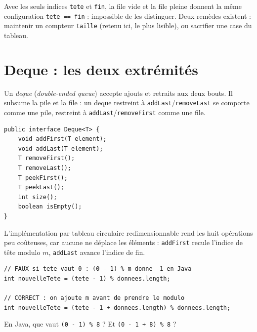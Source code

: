 \documentclass[11pt,a4paper]{article}
\theoremstyle{definition}
\theoremstyle{remark}
\begin{document}
\begin{attentionbox}
Avec les seuls indices \texttt{tete} et \texttt{fin}, la file vide et la file
pleine donnent la même configuration \texttt{tete == fin} : impossible de les
distinguer. Deux remèdes existent : maintenir un compteur \texttt{taille}
(retenu ici, le plus lisible), ou sacrifier une case du tableau.
\end{attentionbox}

\section{Deque : les deux extrémités}

Un \emph{deque} (\emph{double-ended queue}) accepte ajouts et retraits aux
deux bouts. Il subsume la pile et la file : un deque restreint à
\texttt{addLast}/\texttt{removeLast} se comporte comme une pile, restreint à
\texttt{addLast}/\texttt{removeFirst} comme une file.

\begin{lstlisting}[caption={L'ADT Deque --- le contrat que vous implémenterez en Lab}]
public interface Deque<T> {
    void addFirst(T element);
    void addLast(T element);
    T removeFirst();
    T removeLast();
    T peekFirst();
    T peekLast();
    int size();
    boolean isEmpty();
}
\end{lstlisting}

L'implémentation par tableau circulaire redimensionnable rend les huit
opérations peu coûteuses, car aucune ne déplace les éléments : \texttt{addFirst}
recule l'indice de tête modulo $m$, \texttt{addLast} avance l'indice de fin.

\begin{lstlisting}[caption={Reculer un indice sans nombre négatif}]
// FAUX si tete vaut 0 : (0 - 1) % m donne -1 en Java
int nouvelleTete = (tete - 1) % donnees.length;

// CORRECT : on ajoute m avant de prendre le modulo
int nouvelleTete = (tete - 1 + donnees.length) % donnees.length;
\end{lstlisting}

\begin{appliboxQ}
En Java, que vaut \texttt{(0 - 1) \% 8} ? Et \texttt{(0 - 1 + 8) \% 8} ?
\end{appliboxQ}
\end{document}
